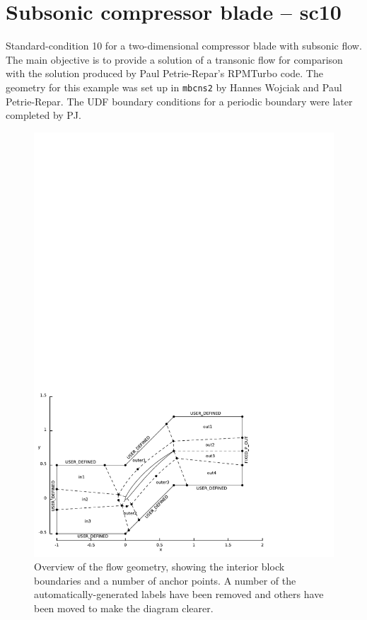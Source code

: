 
\section{Subsonic compressor blade -- sc10}
%
Standard-condition 10 for a two-dimensional compressor blade with subsonic flow.
The main objective is to provide a solution of a transonic flow for comparison with 
the solution produced by Paul Petrie-Repar's RPMTurbo code.
The geometry for this example was set up in \texttt{mbcns2} by Hannes Wojciak and Paul Petrie-Repar.
The UDF boundary conditions for a periodic boundary were later completed by PJ.
%

\begin{figure}[htbp]
\begin{center}
\includegraphics[width=12cm, viewport=0 0 456 326]{../2D/turbo_sc10/sc10-edited.pdf}
\end{center}
\caption{Overview of the flow geometry, showing the interior block boundaries 
  and a number of anchor points.
  A number of the automatically-generated labels have been removed and
  others have been moved to make the diagram clearer.}
\label{trubo-sc10-overall-geometry-fig}
\end{figure}


